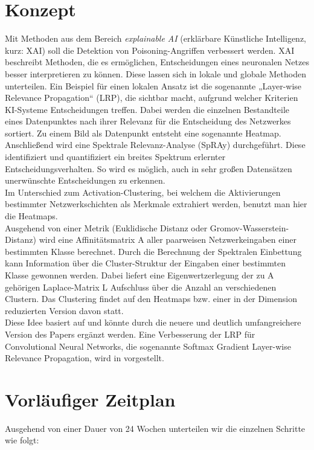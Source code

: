 \documentclass{article}
\theoremstyle{break}
\begin{document}
\section{Konzept}
Mit Methoden aus dem Bereich \textit{explainable AI} (erklärbare Künstliche Intelligenz, kurz: XAI)  soll die Detektion von Poisoning-Angriffen verbessert werden. XAI beschreibt Methoden, die es ermöglichen, Entscheidungen eines neuronalen Netzes besser interpretieren zu können.
Diese lassen sich in lokale und globale Methoden unterteilen. Ein Beispiel für einen lokalen Ansatz ist die sogenannte „Layer-wise Relevance Propagation“ (LRP)\cite{lrp_toolbox, lrp}, die sichtbar macht, aufgrund welcher Kriterien KI-Systeme Entscheidungen treffen. Dabei werden die einzelnen Bestandteile eines Datenpunktes nach ihrer Relevanz für die Entscheidung des Netzwerkes sortiert. Zu einem Bild als Datenpunkt entsteht eine sogenannte Heatmap. \\
Anschließend wird eine Spektrale Relevanz-Analyse (SpRAy)\cite{spray} durchgeführt. Diese identifiziert und quantifiziert ein breites Spektrum erlernter Entscheidungsverhalten. So wird es möglich, auch in sehr großen Datensätzen unerwünschte Entscheidungen zu erkennen\cite{fh2}.\\
Im Unterschied zum Activation-Clustering, bei welchem die Aktivierungen bestimmter Netzwerkschichten als Merkmale extrahiert werden, benutzt man hier die Heatmaps.\\
Ausgehend von einer Metrik (Euklidische Distanz oder  Gromov-Wasserstein-Distanz\cite{gmd}) wird eine Affinitätsmatrix A aller paarweisen Netzwerkeingaben einer bestimmten Klasse berechnet. 
Durch die Berechnung der Spektralen Einbettung kann Information über die Cluster-Struktur der Eingaben einer bestimmten Klasse gewonnen werden. Dabei liefert eine Eigenwertzerlegung der zu A gehörigen Laplace-Matrix L Aufschluss über die Anzahl an verschiedenen Clustern.
Das Clustering findet auf den Heatmaps bzw. einer in der Dimension reduzierten Version davon statt.\\
\noindent Diese Idee basiert auf \cite{ersteIdee} und könnte durch die neuere und deutlich umfangreichere Version des Papers \cite{Weiterentwicklung} ergänzt werden. Eine Verbesserung der LRP für Convolutional Neural Networks, die sogenannte Softmax Gradient Layer-wise Relevance Propagation, wird in \cite{nLRP} vorgestellt.

\section{Vorläufiger Zeitplan}
Ausgehend von einer Dauer von 24 Wochen unterteilen wir die einzelnen Schritte wie folgt:
\end{document}
